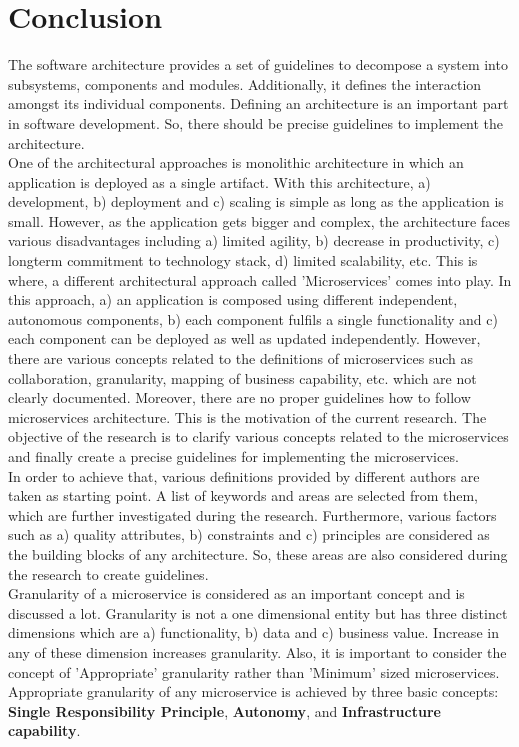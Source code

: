 \chapter{Conclusion}\label{chapter:conclusion}
The software architecture provides a set of guidelines to decompose a system into subsystems, components and modules. Additionally, it defines the interaction amongst its individual components. Defining an architecture is an important part in software development. So, there should be precise guidelines to implement the architecture.\\
One of the architectural approaches is monolithic architecture in which an application is deployed as a single artifact. With this architecture, a) development, b) deployment and c) scaling is simple as long as the application is small. However, as the application gets bigger and complex, the architecture faces various disadvantages including a) limited agility, b) decrease in productivity, c) longterm commitment to technology stack, d) limited scalability, etc. This is where, a different architectural approach called 'Microservices' comes into play. In this approach, a) an application is composed using different independent, autonomous components, b) each component fulfils a single functionality and  c) each component can be deployed as well as updated independently. However, there are various concepts related to the definitions of microservices such as collaboration, granularity, mapping of business capability, etc. which are not clearly documented. Moreover, there are no proper guidelines how to follow microservices architecture. This is the motivation of the current research. The objective of the research is to clarify various concepts related to the microservices and finally create a precise guidelines for implementing the microservices.\\
In order to achieve that, various definitions provided by different authors are taken as starting point. A list of keywords and areas are selected from them, which are further investigated during the research. Furthermore, various factors such as a) quality attributes, b) constraints and c) principles are considered as the building blocks of any architecture. So, these areas are also considered during the research to create guidelines.\\
Granularity of a microservice is considered as an important concept and is discussed a lot. Granularity is not a one dimensional entity but has three distinct dimensions which are a) functionality, b) data and c) business value. Increase in any of these dimension increases granularity. Also, it is important to consider the concept of 'Appropriate' granularity rather than 'Minimum' sized microservices. Appropriate granularity of any microservice is achieved by three basic concepts: \textbf{Single Responsibility Principle}, \textbf{Autonomy}, and \textbf{Infrastructure capability}.
